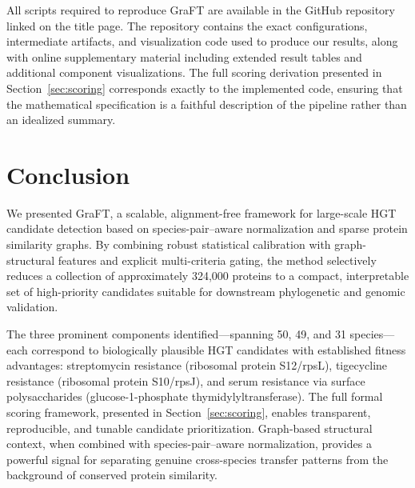 \documentclass[11pt]{article}
\begin{document}
All scripts required to reproduce GraFT are available in the GitHub repository linked on the title page. The repository contains the exact configurations, intermediate artifacts, and visualization code used to produce our results, along with online supplementary material including extended result tables and additional component visualizations. The full scoring derivation presented in Section~\ref{sec:scoring} corresponds exactly to the implemented code, ensuring that the mathematical specification is a faithful description of the pipeline rather than an idealized summary.

\section{Conclusion}

We presented GraFT, a scalable, alignment-free framework for large-scale HGT candidate detection based on species-pair--aware normalization and sparse protein similarity graphs. By combining robust statistical calibration with graph-structural features and explicit multi-criteria gating, the method selectively reduces a collection of approximately 324,000 proteins to a compact, interpretable set of high-priority candidates suitable for downstream phylogenetic and genomic validation.

The three prominent components identified---spanning 50, 49, and 31 species---each correspond to biologically plausible HGT candidates with established fitness advantages: streptomycin resistance (ribosomal protein S12/rpsL), tigecycline resistance (ribosomal protein S10/rpsJ), and serum resistance via surface polysaccharides (glucose-1-phosphate thymidylyltransferase). The full formal scoring framework, presented in Section~\ref{sec:scoring}, enables transparent, reproducible, and tunable candidate prioritization. Graph-based structural context, when combined with species-pair--aware normalization, provides a powerful signal for separating genuine cross-species transfer patterns from the background of conserved protein similarity.






\end{document}
